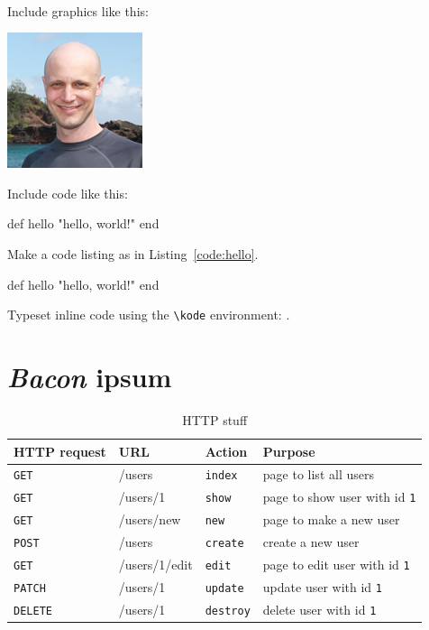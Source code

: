 \PolyTeXnic\

Include graphics like this:

\includegraphics{images/2011_michael_hartl.png}


Include code like this:

\begin{code}
def hello
  "hello, world!"
end
\end{code}

Make a code listing as in Listing~\ref{code:hello}.

\begin{codelisting}
\label{code:hello}
\begin{code}
def hello
  "hello, world!"
end
\end{code}
\end{codelisting}

Typeset inline code using the \verb+\kode+ environment: .

\section{\emph{Bacon} ipsum}
\label{sec:bacon_ipsum}

\begin{table}
\begin{tabular}{llll}
\textbf{HTTP request} & \textbf{URL} & \textbf{Action} & \textbf{Purpose} \\ \hline

\texttt{GET} & /users & \texttt{index} & page to list all users \\
\texttt{GET} & /users/1 & \texttt{show} & page to show user with id \texttt{1}\\
\texttt{GET} & /users/new & \texttt{new} & page to make a new user \\
\texttt{POST} & /users & \texttt{create} & create a new user \\
\texttt{GET} & /users/1/edit & \texttt{edit} & page to edit user with id \texttt{1} \\
\texttt{PATCH} & /users/1 & \texttt{update} & update user with id \texttt{1}  \\
\texttt{DELETE} & /users/1 & \texttt{destroy} & delete user with id \texttt{1}
\end{tabular}
\caption{HTTP stuff\label{table:foo}}
\end{table}


